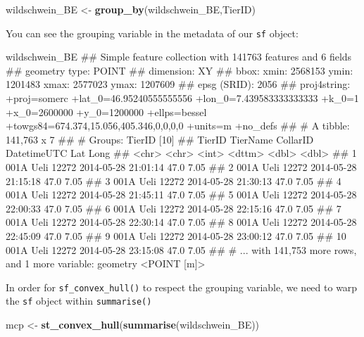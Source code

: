 \documentclass[]{book}
\newenvironment{Shaded}{\begin{snugshade}}{\end{snugshade}}
\newcommand{\KeywordTok}[1]{\textcolor[rgb]{0.13,0.29,0.53}{\textbf{{#1}}}}
\newcommand{\StringTok}[1]{\textcolor[rgb]{0.31,0.60,0.02}{{#1}}}
\newcommand{\NormalTok}[1]{{#1}}
\theoremstyle{definition}
\theoremstyle{definition}
\theoremstyle{definition}
\theoremstyle{remark}
\begin{document}
\begin{Shaded}
\begin{Highlighting}[]
\NormalTok{wildschwein_BE <-}\StringTok{ }\KeywordTok{group_by}\NormalTok{(wildschwein_BE,TierID)}
\end{Highlighting}
\end{Shaded}

You can see the grouping variable in the metadata of our \texttt{sf}
object:

\begin{Shaded}
\begin{Highlighting}[]
\NormalTok{wildschwein_BE}
\NormalTok{## Simple feature collection with 141763 features and 6 fields}
\NormalTok{## geometry type:  POINT}
\NormalTok{## dimension:      XY}
\NormalTok{## bbox:           xmin: 2568153 ymin: 1201483 xmax: 2577023 ymax: 1207609}
\NormalTok{## epsg (SRID):    2056}
\NormalTok{## proj4string:    +proj=somerc +lat_0=46.95240555555556 +lon_0=7.439583333333333 +k_0=1 +x_0=2600000 +y_0=1200000 +ellps=bessel +towgs84=674.374,15.056,405.346,0,0,0,0 +units=m +no_defs}
\NormalTok{## # A tibble: 141,763 x 7}
\NormalTok{## # Groups:   TierID [10]}
\NormalTok{##    TierID TierName CollarID DatetimeUTC           Lat  Long}
\NormalTok{##    <chr>  <chr>       <int> <dttm>              <dbl> <dbl>}
\NormalTok{##  1 001A   Ueli        12272 2014-05-28 21:01:14  47.0  7.05}
\NormalTok{##  2 001A   Ueli        12272 2014-05-28 21:15:18  47.0  7.05}
\NormalTok{##  3 001A   Ueli        12272 2014-05-28 21:30:13  47.0  7.05}
\NormalTok{##  4 001A   Ueli        12272 2014-05-28 21:45:11  47.0  7.05}
\NormalTok{##  5 001A   Ueli        12272 2014-05-28 22:00:33  47.0  7.05}
\NormalTok{##  6 001A   Ueli        12272 2014-05-28 22:15:16  47.0  7.05}
\NormalTok{##  7 001A   Ueli        12272 2014-05-28 22:30:14  47.0  7.05}
\NormalTok{##  8 001A   Ueli        12272 2014-05-28 22:45:09  47.0  7.05}
\NormalTok{##  9 001A   Ueli        12272 2014-05-28 23:00:12  47.0  7.05}
\NormalTok{## 10 001A   Ueli        12272 2014-05-28 23:15:08  47.0  7.05}
\NormalTok{## # ... with 141,753 more rows, and 1 more variable: geometry <POINT [m]>}
\end{Highlighting}
\end{Shaded}

In order for \texttt{sf\_convex\_hull()} to respect the grouping
variable, we need to warp the \texttt{sf} object within
\texttt{summarise()}

\begin{Shaded}
\begin{Highlighting}[]
\NormalTok{mcp <-}\StringTok{ }\KeywordTok{st_convex_hull}\NormalTok{(}\KeywordTok{summarise}\NormalTok{(wildschwein_BE))}
\end{Highlighting}
\end{Shaded}
\end{document}
